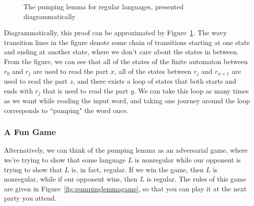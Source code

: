\begin{figure}[b]
\centering
{}
\caption{The pumping lemma for regular languages, presented diagrammatically}
\label{fig:pumpinglemma}
\end{figure}

Diagrammatically, this proof can be approximated by Figure~\ref{fig:pumpinglemma}. The wavy transition lines in the figure denote some chain of transitions starting at one state and ending at another state, where we don't care about the states in between. From the figure, we can see that all of the states of the finite automaton between $r_{0}$ and $r_{j}$ are used to read the part $x$, all of the states between $r_{j}$ and $r_{n+1}$ are used to read the part $z$, and there exists a loop of states that both starts and ends with $r_{j}$ that is used to read the part $y$. We can take this loop as many times as we want while reading the input word, and taking one journey around the loop corresponds to ``pumping" the word once.

\subsubsection*{A Fun Game}

Alternatively, we can think of the pumping lemma as an adversarial game, where we're trying to show that some language $L$ is nonregular while our opponent is trying to show that $L$ is, in fact, regular. If we win the game, then $L$ is nonregular, while if our opponent wins, then $L$ is regular. The rules of this game are given in Figure~\ref{fig:pumpinglemmagame}, so that you can play it at the next party you attend.


